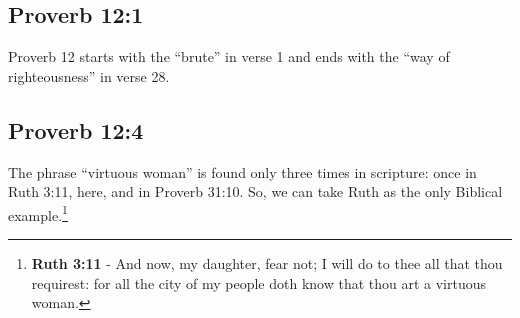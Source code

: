 \begin{longtable}{c|p{2.1in}|p{2.1in}}
\end{longtable}

\subsection{Proverb 12:1}
Proverb 12 starts with the ``brute'' in verse 1 and ends with the ``way of righteousness'' in verse 28.


\subsection{Proverb 12:4}
The phrase ``virtuous woman'' is found only three times in scripture: once in Ruth 3:11, here, and in Proverb 31:10. So, we can take Ruth as the only Biblical example.\footnote{\textbf{Ruth 3:11} - And now, my daughter, fear not; I will do to thee all that thou requirest: for all the city of my people doth know that thou art a virtuous woman.}


